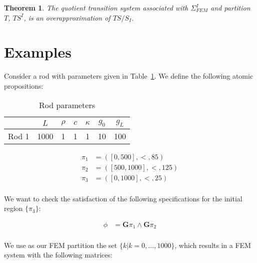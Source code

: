 \documentclass{article}
\newtheorem{theorem}{Theorem}
\newcommand{\Always}{\mathbf{G}}
\begin{document}
\begin{theorem}

The quotient transition system associated with $\Sigma_{FEM}^I$ and
partition $T$, $TS^I$, is an overapproximation of $TS/S_I$.
    
\end{theorem}

\section{Examples}
\label{sec:examples}

Consider a rod with parameters given in Table~\ref{tab:ex_pars}. We define
the following atomic propositions: 

\begin{table}
\centering
\begin{tabular}{|c|c|c|c|c|c|c|}
    \hline
    & $L$ & $\rho$ & $c$ & $\kappa$ & $g_0$ & $g_L$ \\
    \hline
    Rod 1 & 1000 & 1 & 1 & 1 & 10 & 100 \\
    \hline
\end{tabular}
\caption{Rod parameters}
\label{tab:ex_pars}
\end{table}

\begin{equation}
    \begin{aligned}
        \pi_1 &= ([0, 500], <, 85) \\
        \pi_2 &= ([500, 1000], <, 125) \\
        \pi_3 &= ([0, 1000], <, 25) \\
    \end{aligned}
\end{equation}

We want to check the satisfaction of the following specifications for the
initial region $\{\pi_3\}$:

\begin{equation}
\label{eq:ex_specs}
    \begin{aligned}
        \phi &= \Always \pi_1 \wedge \Always \pi_2 \\ 
    \end{aligned}
\end{equation}

We use as our FEM partition the set $\{k | k = 0,...,1000\}$, which results
in a FEM system with the following matrices:
\end{document}
